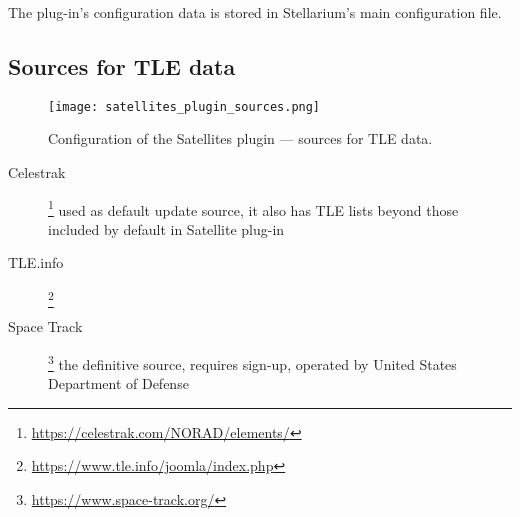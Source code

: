 The plug-in's configuration data is stored in Stellarium's main configuration
file.

\subsection{Sources for TLE data}

\begin{figure}[tbp]
	\centering\texttt{[image: satellites\_plugin\_sources.png]}
	\caption{Configuration of the Satellites plugin --- sources for TLE data.}
	\label{fig:plugins:Satellites:Configuration:Sources}
\end{figure}

\begin{description}
\item[Celestrak]\footnote{\url{https://celestrak.com/NORAD/elements/}} used as default update source, it also has TLE lists
  beyond those included by default in Satellite plug-in
\item[TLE.info]\footnote{\url{https://www.tle.info/joomla/index.php}}
\item[Space Track]\footnote{\url{https://www.space-track.org/}} the definitive source, requires sign-up, operated by
  United States Department of Defense
\end{description}

%
%
%


